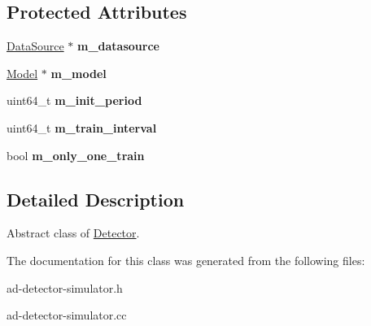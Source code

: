 \subsection*{Protected Attributes}
\begin{DoxyCompactItemize}
\item 
\hypertarget{classns3_1_1Detector_a1bd1b6fa34df0ffbbdc610bf4ddff639}{}\hyperlink{classns3_1_1DataSource}{Data\+Source} $\ast$ {\bfseries m\+\_\+datasource}\label{classns3_1_1Detector_a1bd1b6fa34df0ffbbdc610bf4ddff639}

\item 
\hypertarget{classns3_1_1Detector_abc82d62718c8cf93caf27faceff8a719}{}\hyperlink{classns3_1_1Model}{Model} $\ast$ {\bfseries m\+\_\+model}\label{classns3_1_1Detector_abc82d62718c8cf93caf27faceff8a719}

\item 
\hypertarget{classns3_1_1Detector_a08b2e35a9f6206b2ca25f674b09d9b9c}{}uint64\+\_\+t {\bfseries m\+\_\+init\+\_\+period}\label{classns3_1_1Detector_a08b2e35a9f6206b2ca25f674b09d9b9c}

\item 
\hypertarget{classns3_1_1Detector_a9833b6d578c0ec6b1d204307eaaa7267}{}uint64\+\_\+t {\bfseries m\+\_\+train\+\_\+interval}\label{classns3_1_1Detector_a9833b6d578c0ec6b1d204307eaaa7267}

\item 
\hypertarget{classns3_1_1Detector_a805685afe6ca85ebe299cdbc42696cc1}{}bool {\bfseries m\+\_\+only\+\_\+one\+\_\+train}\label{classns3_1_1Detector_a805685afe6ca85ebe299cdbc42696cc1}

\end{DoxyCompactItemize}


\subsection{Detailed Description}
Abstract class of \hyperlink{classns3_1_1Detector}{Detector}. 

The documentation for this class was generated from the following files\+:\begin{DoxyCompactItemize}
\item 
ad-\/detector-\/simulator.\+h\item 
ad-\/detector-\/simulator.\+cc\end{DoxyCompactItemize}
